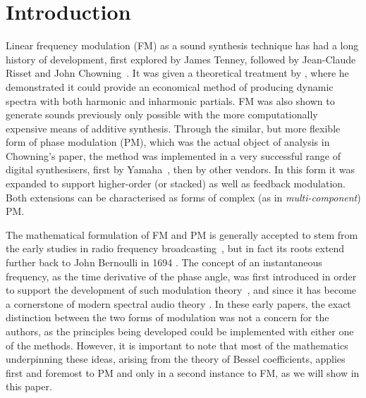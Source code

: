 \documentclass[]{interact}
\begin{document}
\section{Introduction}

Linear frequency modulation (FM) as a sound synthesis technique has had a long history of development, first explored by James Tenney, followed by
Jean-Claude Risset and John Chowning~\citep{Lazzarini2023}. It was given a theoretical treatment by \cite{ChowningFM}, where he demonstrated it could provide an economical method of producing dynamic spectra with both harmonic and inharmonic partials. FM was also shown to generate sounds previously only possible with the more computationally expensive means of additive synthesis. Through the similar, but more flexible form of phase modulation (PM), which was the actual object of analysis in Chowning's paper, the method was implemented in a very successful range of digital synthesisers, first by Yamaha~\citep{FMTheory}, then by other vendors. In this form it was expanded to support higher-order (or stacked) as well as feedback modulation. Both extensions can be characterised as forms of complex (as in \emph{multi-component}) PM. 

The mathematical formulation of FM and PM is generally accepted to stem from the early studies in radio frequency broadcasting~\citep{Bloch, Corrington}, but in fact its roots extend further back to John Bernoulli in 1694 \citep[p.1]{Watson}. The concept of an instantaneous frequency, as the time derivative of the phase angle, was first introduced in order to support the development of 
such modulation theory~\citep{Carlson}, and since \cite{Gabor} it has become a cornerstone of modern spectral audio theory \citep{Lazzarini2021}. In these early papers, the exact distinction between the two forms of modulation was not a concern for the authors, as the principles being developed could be implemented with either one of the methods. However, it is important to note that most of the mathematics underpinning these ideas, arising from the theory of Bessel coefficients, applies first and foremost to PM and only in a second instance to FM, as we will show in this paper. 
\end{document}
